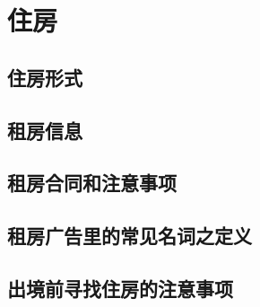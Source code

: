 \chapter{住房}

\section{住房形式}

\section{租房信息}

\section{租房合同和注意事项}

\section{租房广告里的常见名词之定义}

\section{出境前寻找住房的注意事项}
